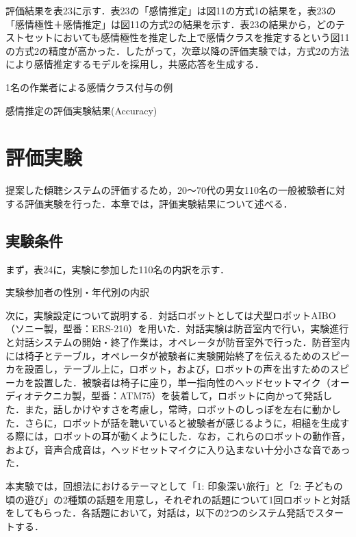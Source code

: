 \documentclass[japanese]{jnlp_1.4}
\begin{document}
評価結果を表23に示す．表23の「感情推定」は図11の方式1の結果を，表23の「感情極性＋感情推定」は図11の方式2の結果を示す．表23の結果から，どのテストセットにおいても感情極性を推定した上で感情クラスを推定するという図11の方式2の精度が高かった．したがって，次章以降の評価実験では，方式2の方法により感情推定するモデルを採用し，共感応答を生成する．

\begin{table}[t]
\caption{1名の作業者による感情クラス付与の例}
\label{table:22}

\end{table}
\begin{table}[t]
\caption{感情推定の評価実験結果(Accuracy)}
\label{table:23}

\end{table}


\section{評価実験}

提案した傾聴システムの評価するため，20〜70代の男女110名の一般被験者に対する評価実験を行った．本章では，評価実験結果について述べる．


\subsection{実験条件}

まず，表24に，実験に参加した110名の内訳を示す．

\begin{table}[b]
\caption{実験参加者の性別・年代別の内訳}
\label{table:24}

\end{table}

次に，実験設定について説明する．対話ロボットとしては犬型ロボットAIBO（ソニー製，型番：ERS-210）を用いた．対話実験は防音室内で行い，実験進行と対話システムの開始・終了作業は，オペレータが防音室外で行った．防音室内には椅子とテーブル，オペレータが被験者に実験開始終了を伝えるためのスピーカを設置し，テーブル上に，ロボット，および，ロボットの声を出すためのスピーカを設置した．被験者は椅子に座り，単一指向性のヘッドセットマイク（オーディオテクニカ製，型番：ATM75）を装着して，ロボットに向かって発話した．また，話しかけやすさを考慮し，常時，ロボットのしっぽを左右に動かした．さらに，ロボットが話を聴いていると被験者が感じるように，相槌を生成する際には，ロボットの耳が動くようにした．なお，これらのロボットの動作音，および，音声合成音は，ヘッドセットマイクに入り込まない十分小さな音であった．

本実験では，回想法におけるテーマとして「1: 印象深い旅行」と「2: 子どもの頃の遊び」の2種類の話題を用意し，それぞれの話題について1回ロボットと対話をしてもらった．各話題において，対話は，以下の2つのシステム発話でスタートする．
\end{document}

